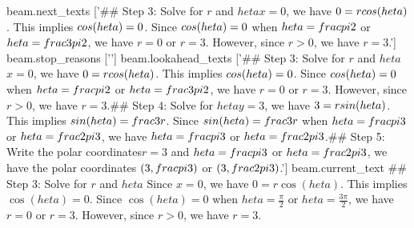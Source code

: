 beam.next_texts
['## Step 3: Solve for $r$ and $heta$\nSince $x = 0$, we have $0 = r\\cos(heta)$. This implies $\\cos(heta) = 0$. Since $\\cos(heta) = 0$ when $heta = \\frac{\\pi}{2}$ or $heta = \\frac{3\\pi}{2}$, we have $r = 0$ or $r = 3$. However, since $r > 0$, we have $r = 3$.\n\n']
beam.stop_reasons
['\n\n']
beam.lookahead_texts
['## Step 3: Solve for $r$ and $heta$\nSince $x = 0$, we have $0 = r\\cos(heta)$. This implies $\\cos(heta) = 0$. Since $\\cos(heta) = 0$ when $heta = \\frac{\\pi}{2}$ or $heta = \\frac{3\\pi}{2}$, we have $r = 0$ or $r = 3$. However, since $r > 0$, we have $r = 3$.\n\n## Step 4: Solve for $heta$\nSince $y = 3$, we have $3 = r\\sin(heta)$. This implies $\\sin(heta) = \\frac{3}{r}$. Since $\\sin(heta) = \\frac{3}{r}$ when $heta = \\frac{\\pi}{3}$ or $heta = \\frac{2\\pi}{3}$, we have $heta = \\frac{\\pi}{3}$ or $heta = \\frac{2\\pi}{3}$.\n\n## Step 5: Write the polar coordinates\nSince $r = 3$ and $heta = \\frac{\\pi}{3}$ or $heta = \\frac{2\\pi}{3}$, we have the polar coordinates $(3,\\frac{\\pi}{3})$ or $(3,\\frac{2\\pi}{3})$.\n\n']
beam.current_text
## Step 3: Solve for $r$ and $heta$
Since $x = 0$, we have $0 = r\cos(heta)$. This implies $\cos(heta) = 0$. Since $\cos(heta) = 0$ when $heta = \frac{\pi}{2}$ or $heta = \frac{3\pi}{2}$, we have $r = 0$ or $r = 3$. However, since $r > 0$, we have $r = 3$.


